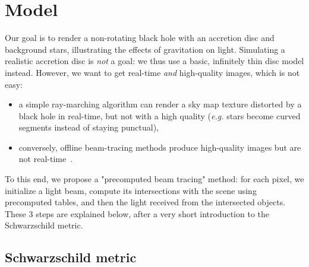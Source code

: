 \documentclass{document}
\begin{document}
\section{Model}\label{sec:model}

Our goal is to render a non-rotating black hole with an accretion disc and 
background stars, illustrating the effects of gravitation on light. Simulating 
a realistic accretion disc is {\em not} a goal: we thus use a basic, infinitely 
thin disc model instead. However, we want to get real-time {\em and} 
high-quality images, which is not easy:
\begin{itemize}
	\item a simple ray-marching algorithm can render a sky map texture distorted 
	by a black hole in real-time, but not with a high quality ({\em e.g.} stars 
	become curved segments instead of staying punctual),
	\item conversely, offline beam-tracing methods produce high-quality images 
	but are not real-time~\cite{James2015}.
\end{itemize}
To this end, we propose a "precomputed beam tracing" method: for each pixel, we 
initialize a light beam, compute its intersections with the scene using 
precomputed tables, and then the light received from the intersected objects. 
These 3 steps are explained below, after a very short introduction to the 
Schwarzschild metric.

\subsection{Schwarzschild metric}
\end{document}
